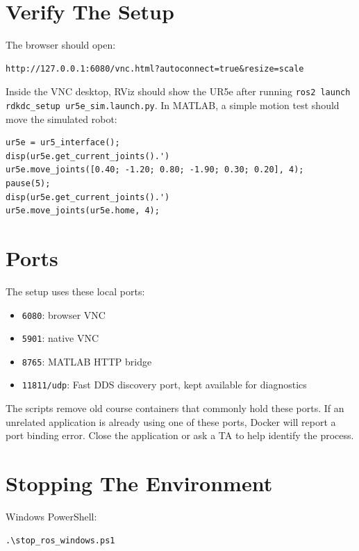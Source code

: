 \documentclass[11pt]{article}
\begin{document}
\section*{Verify The Setup}

The browser should open:

\begin{Verbatim}
http://127.0.0.1:6080/vnc.html?autoconnect=true&resize=scale
\end{Verbatim}

Inside the VNC desktop, RViz should show the UR5e after running \texttt{ros2 launch rdkdc\_setup ur5e\_sim.launch.py}. In MATLAB, a simple motion test should move the simulated robot:

\begin{Verbatim}
ur5e = ur5_interface();
disp(ur5e.get_current_joints().')
ur5e.move_joints([0.40; -1.20; 0.80; -1.90; 0.30; 0.20], 4);
pause(5);
disp(ur5e.get_current_joints().')
ur5e.move_joints(ur5e.home, 4);
\end{Verbatim}

\section*{Ports}

The setup uses these local ports:

\begin{itemize}
    \item \texttt{6080}: browser VNC
    \item \texttt{5901}: native VNC
    \item \texttt{8765}: MATLAB HTTP bridge
    \item \texttt{11811/udp}: Fast DDS discovery port, kept available for diagnostics
\end{itemize}

The scripts remove old course containers that commonly hold these ports. If an unrelated application is already using one of these ports, Docker will report a port binding error. Close the application or ask a TA to help identify the process.

\section*{Stopping The Environment}

Windows PowerShell:

\begin{Verbatim}
.\stop_ros_windows.ps1
\end{Verbatim}
\end{document}

